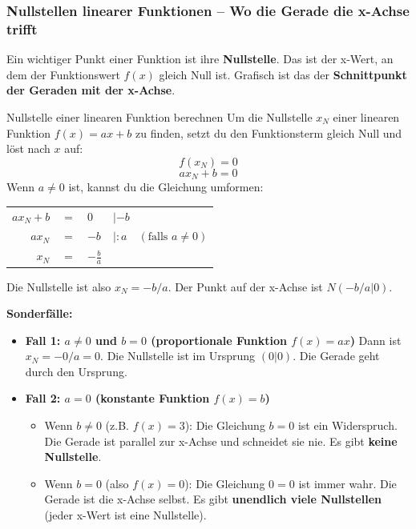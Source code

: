 \subsubsection{Nullstellen linearer Funktionen – Wo die Gerade die x-Achse trifft}
Ein wichtiger Punkt einer Funktion ist ihre \textbf{Nullstelle}. Das ist der x-Wert, an dem der Funktionswert $f(x)$ gleich Null ist. Grafisch ist das der \textbf{Schnittpunkt der Geraden mit der x-Achse}.

\begin{merksatzumgebung}{Nullstelle einer linearen Funktion berechnen}
Um die Nullstelle $x_N$ einer linearen Funktion $f(x) = ax+b$ zu finden, setzt du den Funktionsterm gleich Null und löst nach $x$ auf:
\[ f(x_N) = 0 \]
\[ ax_N + b = 0 \]
Wenn $a \neq 0$ ist, kannst du die Gleichung umformen:
\begin{center}
\begin{tabular}{r @{\,} c @{\,} l @{\quad\quad} l}
$ax_N + b$ & $=$ & $0$ & $| -b$ \\
$ax_N$ & $=$ & $-b$ & $| :a \quad (\text{falls } a \neq 0)$ \\
$x_N$ & $=$ & $-\frac{b}{a}$ & \\
\end{tabular}
\end{center}
Die Nullstelle ist also $x_N = -b/a$. Der Punkt auf der x-Achse ist $N(-b/a | 0)$.

\textbf{Sonderfälle:}
\begin{itemize}
    \item \textbf{Fall 1: $a \neq 0$ und $b=0$ (proportionale Funktion $f(x)=ax$)}
    Dann ist $x_N = -0/a = 0$. Die Nullstelle ist im Ursprung $(0|0)$. Die Gerade geht durch den Ursprung.
    \item \textbf{Fall 2: $a = 0$ (konstante Funktion $f(x)=b$)}
    \begin{itemize}
        \item Wenn $b \neq 0$ (z.B. $f(x)=3$): Die Gleichung $b=0$ ist ein Widerspruch. Die Gerade ist parallel zur x-Achse und schneidet sie nie. Es gibt \textbf{keine Nullstelle}.
        \item Wenn $b = 0$ (also $f(x)=0$): Die Gleichung $0=0$ ist immer wahr. Die Gerade ist die x-Achse selbst. Es gibt \textbf{unendlich viele Nullstellen} (jeder x-Wert ist eine Nullstelle).
    \end{itemize}
\end{itemize}
\end{merksatzumgebung}

